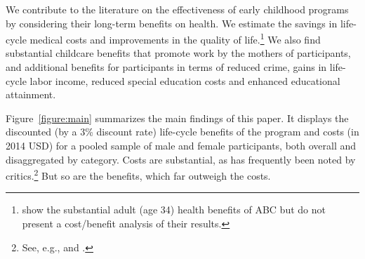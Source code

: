 We contribute to the literature on the effectiveness of early childhood programs by considering their long-term benefits on health. We estimate the savings in life-cycle medical costs and improvements in the quality of life.\footnote{\cite{Campbell_Conti_etal_2014_EarlyChildhoodInvestments} show the substantial adult (age 34) health benefits of ABC but do not present a cost/benefit analysis of their results.} We also find substantial childcare benefits that promote work by the mothers of participants, and additional benefits for participants in terms of reduced crime, gains in life-cycle labor income, reduced special education costs and enhanced educational attainment.

Figure~\ref{figure:main} summarizes the main findings of this paper. It displays the discounted (by a 3\% discount rate) life-cycle benefits of the program and costs (in 2014 USD) for a pooled sample of male and female participants, both overall and disaggregated by category. Costs are substantial, as has frequently been noted by critics.\footnote{See, e.g., \citet{Whitehurst_2014_Senate_Testimony} and \citet{Fox_News_2014_Head_Start_Effects}.} But so are the benefits, which far outweigh the costs.

